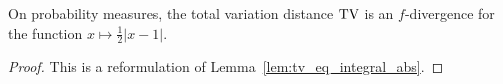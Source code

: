 
\begin{lemma}
  \label{lem:tv_eq_fDiv}
  On probability measures, the total variation distance $\operatorname{TV}$ is an $f$-divergence for the function $x \mapsto \frac{1}{2}\vert x - 1 \vert$.
\end{lemma}

\begin{proof}%
{}
This is a reformulation of Lemma~\ref{lem:tv_eq_integral_abs}.
\end{proof}